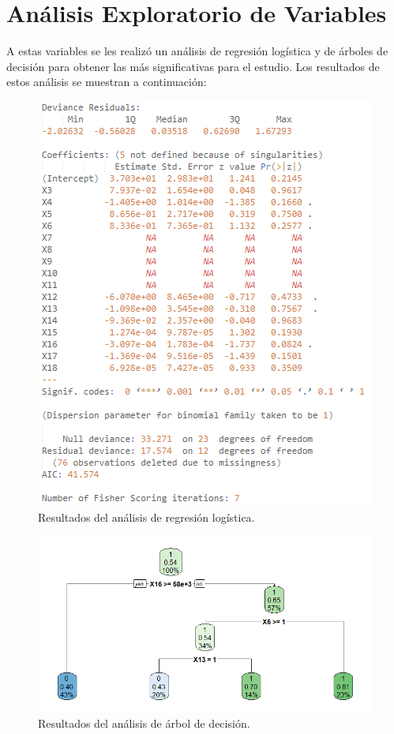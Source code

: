 \section{Análisis Exploratorio de Variables}
A estas variables se les realizó un análisis de regresión logística y de árboles de decisión para obtener las más significativas para el estudio. Los resultados de estos análisis se muestran a continuación:
\begin{figure}
    \centering
    \includegraphics[scale=1.05]{figuras/Capture4.PNG}
    \caption{Resultados del análisis de regresión logística.}
    \label{fig:my_label}
\end{figure}
\begin{figure}
    \centering
    \includegraphics[scale=0.65]{figuras/Rplot1.png}
    \caption{Resultados del análisis de árbol de decisión.}
    \label{fig:my_label}
\end{figure}
